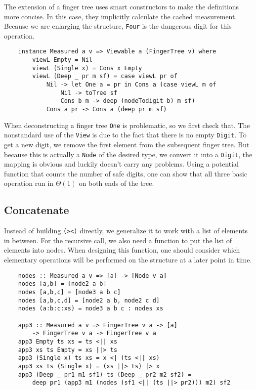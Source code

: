The extension of a finger tree uses smart constructors to make the definitions more concise. In this case, they implicitly calculate the cached measurement. Because we are enlarging the structure, \texttt{Four} is the dangerous digit for this operation.

\begin{verbatim}
    instance Measured a v => Viewable a (FingerTree v) where
        viewL Empty = Nil
        viewL (Single x) = Cons x Empty
        viewL (Deep _ pr m sf) = case viewL pr of
            Nil -> let One a = pr in Cons a (case viewL m of
                Nil -> toTree sf
                Cons b m -> deep (nodeTodigit b) m sf)
            Cons a pr -> Cons a (deep pr m sf)
\end{verbatim}

When deconstructing a finger tree \texttt{One} is problematic, so we first check that. The nonstandard use of the \texttt{View} is due to the fact that there is no empty \texttt{Digit}. To get a new digit, we remove the first element from the subsequent finger tree. But because this is actually a \texttt{Node} of the desired type, we convert it into a \texttt{Digit}, the mapping is obvious and luckily doesn't carry any problems. Using a potential function that counts the number of safe digits, one can show that all three basic operation run in \(\Theta(1)\) on both ends of the tree.\par

\subsection{Concatenate}

Instead of building \texttt{(><)} directly, we generalize it to work with a list of elements in between. For the recursive call, we also need a function to put the list of elements into nodes. When designing this function, one should consider which elementary operations will be performed on the structure at a later point in time.

\begin{verbatim}
    nodes :: Measured a v => [a] -> [Node v a]
    nodes [a,b] = [node2 a b]
    nodes [a,b,c] = [node3 a b c]
    nodes [a,b,c,d] = [node2 a b, node2 c d]
    nodes (a:b:c:xs) = node3 a b c : nodes xs

    app3 :: Measured a v => FingerTree v a -> [a]
        -> FingerTree v a -> FingerTree v a
    app3 Empty ts xs = ts <|| xs
    app3 xs ts Empty = xs ||> ts
    app3 (Single x) ts xs = x <| (ts <|| xs)
    app3 xs ts (Single x) = (xs ||> ts) |> x
    app3 (Deep _ pr1 m1 sf1) ts (Deep _ pr2 m2 sf2) =
        deep pr1 (app3 m1 (nodes (sf1 <|| (ts ||> pr2))) m2) sf2
\end{verbatim}

